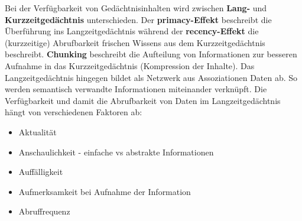 Bei der Verfügbarkeit von Gedächtnisinhalten wird zwischen \textbf{Lang-}
und \textbf{Kurzzeitgedächtnis} unterschieden. Der \textbf{primacy-Effekt}
beschreibt die Überführung ins Langzeitgedächtnis während der
\textbf{recency-Effekt} die (kurzzeitige) Abrufbarkeit frischen Wissens aus dem
Kurzzeitgedächtnis beschreibt.
\textbf{Chunking} beschreibt die Aufteilung von Informationen zur besseren
Aufnahme in das Kurzzeitgedächtnis (Kompression der Inhalte). Das
Langzeitgedächtnis hingegen bildet als Netzwerk aus Assoziationen Daten ab.
So werden semantisch verwandte Informationen miteinander verknüpft. Die
Verfügbarkeit und damit die Abrufbarkeit von Daten im Langzeitgedächtnis
hängt von verschiedenen Faktoren ab:
\begin{itemize}
    \item Aktualität
    \item Anschaulichkeit - einfache vs abstrakte Informationen
    \item Auffälligkeit
    \item Aufmerksamkeit bei Aufnahme der Information
    \item Abruffrequenz
\end{itemize}

